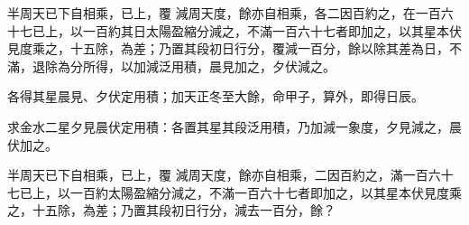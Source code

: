 \begin{pinyinscope}
 半周天已下自相乘，已上，覆
 減周天度，餘亦自相乘，各二因百約之，在一百六十七已上，以一百約其日太陽盈縮分減之，不滿一百六十七者即加之，以其星本伏見度乘之，十五除，為差；乃置其段初日行分，覆減一百分，餘以除其差為日，不滿，退除為分所得，以加減泛用積，晨見加之，夕伏減之。



 各得其星晨見、夕伏定用積；加天正冬至大餘，命甲子，算外，即得日辰。



 求金水二星夕見晨伏定用積：各置其星其段泛用積，乃加減一象度，夕見減之，晨伏加之。



 半周天已下自相乘，已上，覆
 減周天度，餘亦自相乘，二因百約之，滿一百六十七已上，以一百約太陽盈縮分減之，不滿一百六十七者即加之，以其星本伏見度乘之，十五除，為差；乃置其段初日行分，減去一百分，餘？



\end{pinyinscope}